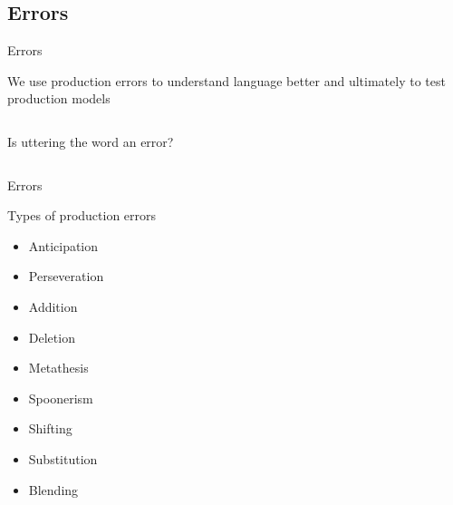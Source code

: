 \documentclass{beamer}
\newcommand{\subonefour}{Errors}
\begin{document}
    \subsection{\subonefour}
      \begin{frame}{\subonefour}
        \begin{block}{}
          We use production errors to understand language better and ultimately to test production models
        \end{block}
        \begin{columns}
          \begin{block}{Is uttering the word  an error?}
          \end{block}
        \end{columns}
      \end{frame}

      \begin{frame}{\subonefour}
        \begin{block}{Types of production errors}
          \begin{itemize}
            \item Anticipation
            \item Perseveration
            \item Addition
            \item Deletion
            \item Metathesis
            \item Spoonerism
            \item Shifting
            \item Substitution
            \item Blending
          \end{itemize}
        \end{block}
      \end{frame}
\end{document}
